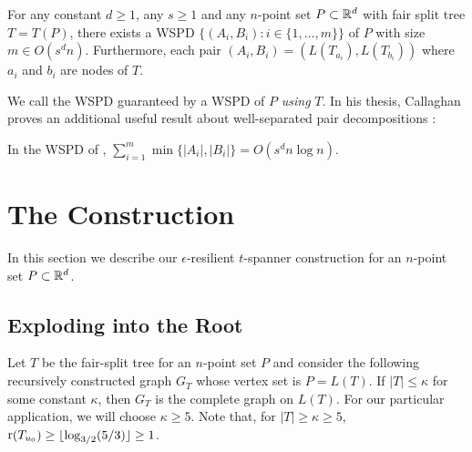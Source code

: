 \documentclass{patmorin}
\DeclareMathOperator{\rank}{r}
\begin{document}
\begin{thm}
  For any constant $d\ge 1$, any $s\ge 1$ and any $n$-point set
  $P\subset\mathbb{R}^d$ with fair split tree $T=T(P)$, there exists a WSPD
  $\{(A_i,B_i):i\in\{1,\ldots,m\}\}$ of $P$ with size $m\in O(s^d n)$.
  Furthermore, each pair $(A_i,B_i)=(L(T_{a_i}),L(T_{b_i}))$ where $a_i$
  and $b_i$ are nodes of $T$.
\end{thm}
We call the WSPD guaranteed by  a WSPD of $P$ \emph{using}
$T$.  In his thesis, Callaghan proves an additional useful result about
well-separated pair decompositions \cite[Section~4.5]{callahan:dealing}:

\begin{lem}[Callaghan 1995]
  In the WSPD of ,
   $\sum_{i=1}^m\min\{|A_i|,|B_i|\} = O(s^d n\log n)$.
\end{lem}


\section{The Construction}

In this section we describe our $\epsilon$-resilient $t$-spanner construction for an $n$-point set $P\subset\mathbb{R}^d$.

\subsection{Exploding into the Root}

Let $T$ be the fair-split tree for an $n$-point set $P$ and consider
the following recursively constructed graph $G_{T}$ whose vertex set
is $P=L(T)$.  If $|T| \le \kappa$ for some constant $\kappa$, then $G_T$
is the complete graph on $L(T)$. For our particular application, we will choose $\kappa\ge 5$.  Note that, for $|T|\ge\kappa\ge 5$, $\rank(T_{u_0}) \ge \floor{\log_{3/2}(5/3)} \ge 1$.
\end{document}
